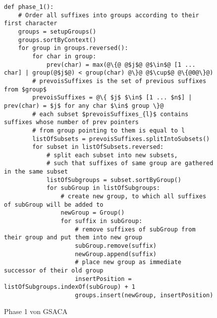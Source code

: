 \begin{figure}
\begin{verbatim}
def phase_1():
	# Order all suffixes into groups according to their first character
	groups = setupGroups()
	groups.sortByContext()
	for group in groups.reversed():
		for char in group:
			prev(char) = max(@\{@ @$j$@ @$\in$@ [1 ... char] | group(@$j$@) < group(char) @\}@ @$\cup$@ @\{@0@\}@)
		# prevoisSuffixes is the set of previous suffixes from $group$
		prevoisSuffixes = @\{ $j$ $\in$ [1 ... $n$] | prev(char) = $j$ for any char $\in$ group \}@
		# each subset $prevoisSuffixes_{l}$ contains suffixes whose number of prev pointers
		# from group pointing to them is equal to l
		listOfSubsets = prevoisSuffixes.splitIntoSubsets()
		for subset in listOfSubsets.reversed:
			# split each subset into new subsets, 
			# such that suffixes of same group are gathered in the same subset
			listOfSubgroups = subset.sortByGroup()
			for subGroup in listOfSubgroups:
				# create new group, to which all suffixes of subGroup will be added to
				newGroup = Group()
				for suffix in subGroup:
					# remove suffixes of subGroup from their group and put them into new group
					subGroup.remove(suffix)
					newGroup.append(suffix)
					# place new group as immediate successor of their old group
					insertPosition = listOfSubgroups.indexOf(subGroup) + 1
					groups.insert(newGroup, insertPosition)
\end{verbatim}
\caption[Phase 1 von GSACA]{Phase 1 von GSACA}
\label{saca:3:code_1}
\end{figure}